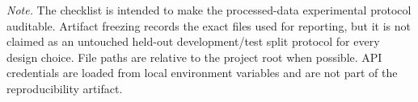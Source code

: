 \noindent\emph{Note.} The checklist is intended to make the processed-data experimental protocol auditable. Artifact freezing records the exact files used for reporting, but it is not claimed as an untouched held-out development/test split protocol for every design choice. File paths are relative to the project root when possible. API credentials are loaded from local environment variables and are not part of the reproducibility artifact.
\endgroup
